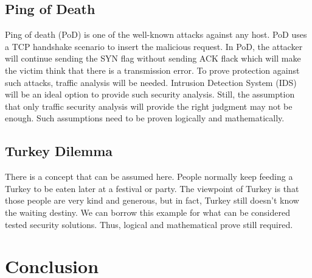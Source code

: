 \documentclass[journal]{IEEEtran}
\begin{document}
\subsection{Ping of Death}
Ping of death (PoD) is one of the well-known attacks against any host. PoD uses a TCP handshake
scenario to insert the malicious request. In PoD, the attacker will continue sending the SYN flag
without sending ACK flack which will make the victim think that there is a transmission error. To
prove protection against such attacks, traffic analysis will be needed. Intrusion Detection System
(IDS) will be an ideal option to provide such security analysis. Still, the assumption that only
traffic security analysis will provide the right judgment may not be enough. Such assumptions need
to be proven logically and mathematically.


\subsection{Turkey Dilemma}
There is a concept that can be assumed here. People normally keep feeding a Turkey to be eaten later at
a festival or party. The viewpoint of Turkey is that those people are very kind and generous, but in fact,
Turkey still doesn't know the waiting destiny. We can borrow this example for what can be considered tested
security solutions. Thus, logical and mathematical prove still required.
\section{Conclusion}





\end{document}
